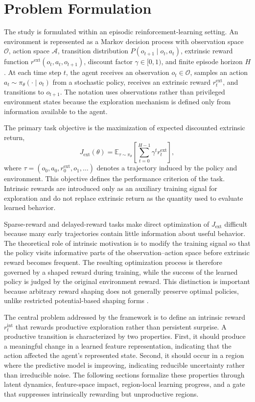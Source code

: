 \section{Problem Formulation}
\label{sec:theoretical_problem_formulation}

The study is formulated within an episodic reinforcement-learning setting.
An environment is represented as a Markov decision process with observation space $\mathcal{O}$, action space $\mathcal{A}$, transition distribution $P(o_{t+1}\mid o_t,a_t)$, extrinsic reward function $r^{\mathrm{ext}}(o_t,a_t,o_{t+1})$, discount factor $\gamma\in[0,1)$, and finite episode horizon $H$.
At each time step $t$, the agent receives an observation $o_t\in\mathcal{O}$, samples an action $a_t\sim\pi_\theta(\cdot\mid o_t)$ from a stochastic policy, receives an extrinsic reward $r_t^{\mathrm{ext}}$, and transitions to $o_{t+1}$.
The notation uses observations rather than privileged environment states because the exploration mechanism is defined only from information available to the agent.

The primary task objective is the maximization of expected discounted extrinsic return,
\begin{equation}
    J_{\mathrm{ext}}(\theta)
    = \mathbb{E}_{\tau\sim\pi_\theta}
    \left[\sum_{t=0}^{H-1}\gamma^t r_t^{\mathrm{ext}}\right],
\end{equation}
where $\tau=(o_0,a_0,r_0^{\mathrm{ext}},o_1,\ldots)$ denotes a trajectory induced by the policy and environment.
This objective defines the performance criterion of the task.
Intrinsic rewards are introduced only as an auxiliary training signal for exploration and do not replace extrinsic return as the quantity used to evaluate learned behavior.

Sparse-reward and delayed-reward tasks make direct optimization of $J_{\mathrm{ext}}$ difficult because many early trajectories contain little information about useful behavior.
The theoretical role of intrinsic motivation is to modify the training signal so that the policy visits informative parts of the observation--action space before extrinsic reward becomes frequent.
The resulting optimization process is therefore governed by a shaped reward during training, while the success of the learned policy is judged by the original environment reward.
This distinction is important because arbitrary reward shaping does not generally preserve optimal policies, unlike restricted potential-based shaping forms \parencite{ng-1999}.

The central problem addressed by the framework is to define an intrinsic reward $r_t^{\mathrm{int}}$ that rewards productive exploration rather than persistent surprise.
A productive transition is characterized by two properties.
First, it should produce a meaningful change in a learned feature representation, indicating that the action affected the agent's represented state.
Second, it should occur in a region where the predictive model is improving, indicating reducible uncertainty rather than irreducible noise.
The following sections formalize these properties through latent dynamics, feature-space impact, region-local learning progress, and a gate that suppresses intrinsically rewarding but unproductive regions.